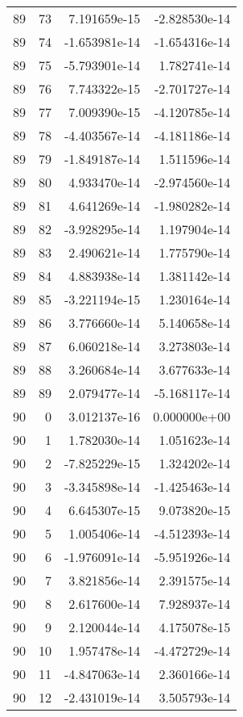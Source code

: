 \begin{tabular}{rrrr}
  89 &   73 &  7.191659e-15 & -2.828530e-14 \\
  89 &   74 & -1.653981e-14 & -1.654316e-14 \\
  89 &   75 & -5.793901e-14 &  1.782741e-14 \\
  89 &   76 &  7.743322e-15 & -2.701727e-14 \\
  89 &   77 &  7.009390e-15 & -4.120785e-14 \\
  89 &   78 & -4.403567e-14 & -4.181186e-14 \\
  89 &   79 & -1.849187e-14 &  1.511596e-14 \\
  89 &   80 &  4.933470e-14 & -2.974560e-14 \\
  89 &   81 &  4.641269e-14 & -1.980282e-14 \\
  89 &   82 & -3.928295e-14 &  1.197904e-14 \\
  89 &   83 &  2.490621e-14 &  1.775790e-14 \\
  89 &   84 &  4.883938e-14 &  1.381142e-14 \\
  89 &   85 & -3.221194e-15 &  1.230164e-14 \\
  89 &   86 &  3.776660e-14 &  5.140658e-14 \\
  89 &   87 &  6.060218e-14 &  3.273803e-14 \\
  89 &   88 &  3.260684e-14 &  3.677633e-14 \\
  89 &   89 &  2.079477e-14 & -5.168117e-14 \\
  90 &    0 &  3.012137e-16 &  0.000000e+00 \\
  90 &    1 &  1.782030e-14 &  1.051623e-14 \\
  90 &    2 & -7.825229e-15 &  1.324202e-14 \\
  90 &    3 & -3.345898e-14 & -1.425463e-14 \\
  90 &    4 &  6.645307e-15 &  9.073820e-15 \\
  90 &    5 &  1.005406e-14 & -4.512393e-14 \\
  90 &    6 & -1.976091e-14 & -5.951926e-14 \\
  90 &    7 &  3.821856e-14 &  2.391575e-14 \\
  90 &    8 &  2.617600e-14 &  7.928937e-14 \\
  90 &    9 &  2.120044e-14 &  4.175078e-15 \\
  90 &   10 &  1.957478e-14 & -4.472729e-14 \\
  90 &   11 & -4.847063e-14 &  2.360166e-14 \\
  90 &   12 & -2.431019e-14 &  3.505793e-14 \\

\end{tabular}

